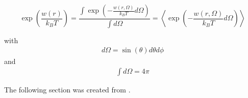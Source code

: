 \documentclass[letterpaper,10pt,english]{sphinxmanual}
\begin{document}
\sphinxAtStartPar
\begin{equation}
\exp\left ( \frac{w(r)}{k_B T} \right)=\frac{\int \exp\left (-\frac{w(r,\Omega)}{k_B T} d\Omega\right )}{\int d\Omega}=\left \langle  \exp\left (-\frac{w(r,\Omega)}{k_B T} d\Omega\right ) \right \rangle
\end{equation}

\sphinxAtStartPar
with
\begin{equation*}
\begin{split}d\Omega =\sin(\theta)d\theta d\phi\end{split}
\end{equation*}
\sphinxAtStartPar
and
\begin{equation*}
\begin{split}\int d\Omega=4\pi\end{split}
\end{equation*}


\sphinxAtStartPar
The following section was created from .
\end{document}
